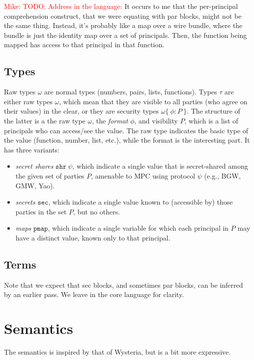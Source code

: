 \documentclass[10pt]{article}
\newcommand{\ssec}{\ensuremath{\mathtt{sec}}}
\newcommand{\isec}{\ensuremath{\mathtt{pmap}}}
\newcommand{\sshare}[1]{\ensuremath{\mathtt{shr}~{#1}}}
\newcommand{\sectyp}[3]{\ensuremath{{#1} \{~{#2}:{#3}~\}}}
\newcommand{\mwh}[1]{\textcolor{red}{Mike: #1}}
\begin{document}
\mwh{TODO: Address in the language:} It occurs to me that the
per-principal comprehension construct, that we were equating with par
blocks, might not be the same thing. Instead, it's probably like a map
over a wire bundle, where the bundle is just the identity map over a
set of principals. Then, the function being mapped has access to that
principal in that function.

\subsection{Types}

Raw types $\omega$ are normal types (numbers, pairs, lists,
functions). Types $\tau$ are either raw types $\omega$, which mean
that they are visible to all parties (who agree on their values) in
the clear, or they are security types $\sectyp{\omega}{\phi}{P}$. The
structure of the latter is a the raw type $\omega$, the \emph{format}
$\phi$, and visibility $P$, which is a list of principals who can
access/see the value.  The raw type indicates the basic type of the
value (function, number, list, etc.), while the format is the
interesting part. It has three variants:
\begin{itemize}
\item \emph{secret shares} $\sshare\psi$, which indicate a single
  value that is secret-shared among the given set of parties $P$,
  amenable to MPC using protocol $\psi$ (e.g., BGW, GMW, Yao).
\item \emph{secrets} \ssec, which indicate a single value known to
  (accessible by) those parties in the set $P$, but no others.
\item \emph{maps} \isec, which indicate a single variable for which
  each principal in $P$ may have a distinct value, known only to that
  principal. 
\end{itemize}

\subsection{Terms}

Note that we expect that sec blocks, and sometimes par blocks, can be
inferred by an earlier pass. We leave in the core language for clarity.

\section{Semantics}

The semantics is inspired by that of Wysteria, but is a bit more
expressive. 
\end{document}
